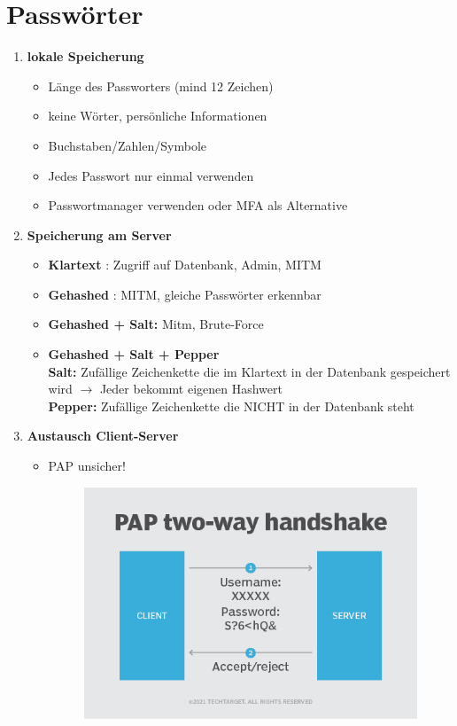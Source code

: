 \section{Passwörter}
\begin{enumerate}
	\item \textbf{lokale Speicherung}
	\begin{itemize}
		\item Länge des Passworters (mind 12 Zeichen)
		\item keine Wörter, persönliche Informationen
		\item Buchstaben/Zahlen/Symbole
		\item Jedes Passwort nur einmal verwenden
		\item Passwortmanager verwenden oder MFA als Alternative
	\end{itemize}
	\item \textbf{Speicherung am Server}
	\begin{itemize}
		\item \textbf{Klartext} \Lightning: Zugriff auf Datenbank, Admin, MITM
		\item \textbf{Gehashed} \Lightning: MITM, gleiche Passwörter erkennbar
		\item \textbf{Gehashed + Salt:} Mitm, Brute-Force
		\item \textbf{Gehashed + Salt + Pepper} \\
		\textbf{Salt:} Zufällige Zeichenkette die im Klartext in der Datenbank gespeichert wird $\rightarrow$ Jeder bekommt eigenen Hashwert \\
		\textbf{Pepper:} Zufällige Zeichenkette die NICHT in der Datenbank steht
	\end{itemize}
	\item \textbf{Austausch Client-Server}
	\begin{itemize}
		\item PAP unsicher! 
		\begin{figure}[H]
			\centering
			\includegraphics[width=0.6\linewidth]{figures/pap.png}

\end{figure}
\end{itemize}
\end{enumerate}
